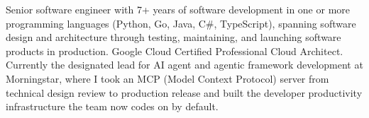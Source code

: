 
\begin{cvparagraph}
Senior software engineer with 7+ years of software development in one or more programming languages (Python, Go, Java, C\#, TypeScript), spanning software design and architecture through testing, maintaining, and launching software products in production. Google Cloud Certified Professional Cloud Architect. Currently the designated lead for AI agent and agentic framework development at Morningstar, where I took an MCP (Model Context Protocol) server from technical design review to production release and built the developer productivity infrastructure the team now codes on by default.
\end{cvparagraph}
